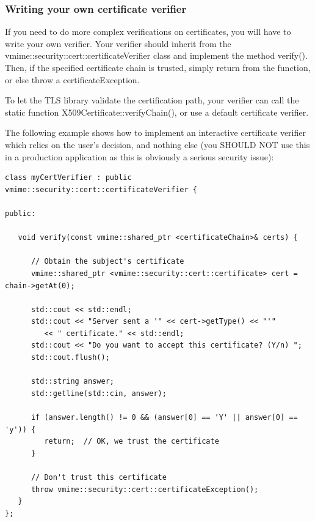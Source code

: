 \subsubsection{Writing your own certificate verifier} %

If you need to do more complex verifications on certificates, you will have to
write your own verifier. Your verifier should inherit from the
{\vcode vmime::security::cert::certificateVerifier} class and implement the
method {\vcode verify()}. Then, if the specified certificate chain is trusted,
simply return from the function, or else throw a
{\vcode certificateException}.

To let the TLS library validate the certification path, your verifier can
call the static function {\vcode X509Certificate::verifyChain()}, or use a
default certificate verifier.

The following example shows how to implement an interactive certificate
verifier which relies on the user's decision, and nothing else (you SHOULD NOT
use this in a production application as this is obviously a serious security
issue):

\begin{lstlisting}[caption={A custom certificate verifier}]
class myCertVerifier : public vmime::security::cert::certificateVerifier {

public:

   void verify(const vmime::shared_ptr <certificateChain>& certs) {

      // Obtain the subject's certificate
      vmime::shared_ptr <vmime::security::cert::certificate> cert = chain->getAt(0);

      std::cout << std::endl;
      std::cout << "Server sent a '" << cert->getType() << "'"
         << " certificate." << std::endl;
      std::cout << "Do you want to accept this certificate? (Y/n) ";
      std::cout.flush();

      std::string answer;
      std::getline(std::cin, answer);

      if (answer.length() != 0 && (answer[0] == 'Y' || answer[0] == 'y')) {
         return;  // OK, we trust the certificate
      }

      // Don't trust this certificate
      throw vmime::security::cert::certificateException();
   }
};
\end{lstlisting}


